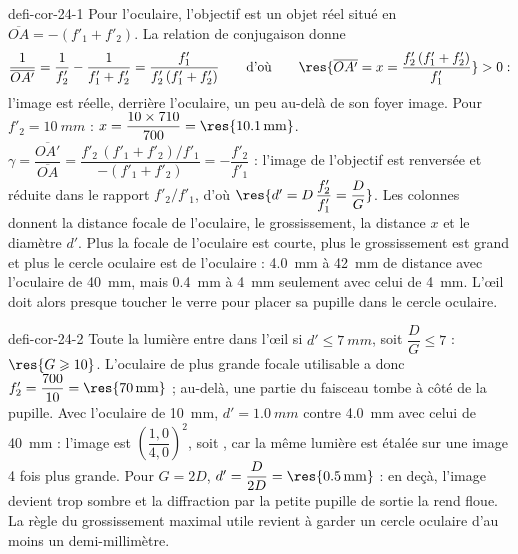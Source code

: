 \begin{blocEdition}{defi-cor-24-1}
Pour l'oculaire, l'objectif est un objet réel situé en $\overline{OA}=-(f'_1+f'_2)$. La relation de conjugaison donne
\[\frac{1}{\overline{OA'}}=\frac{1}{f'_2}-\frac{1}{f'_1+f'_2}=\frac{f'_1}{f'_2\,(f'_1+f'_2)}\qquad\text{d'où}\qquad \res{\overline{OA'}=x=\frac{f'_2\,(f'_1+f'_2)}{f'_1}}>0 :\]
l'image est réelle, derrière l'oculaire, un peu au-delà de son foyer image. Pour $f'_2=\qty{10}{mm}$ :
$x=\dfrac{10\times710}{700}=\res{\qty{10,1}{mm}}$.
$\gamma=\dfrac{\overline{OA'}}{\overline{OA}}=\dfrac{f'_2\,(f'_1+f'_2)/f'_1}{-(f'_1+f'_2)}=-\dfrac{f'_2}{f'_1}$ : l'image de l'objectif est renversée et réduite dans le
rapport $f'_2/f'_1$, d'où $\res{d'=D\,\dfrac{f'_2}{f'_1}=\dfrac{D}{G}}$.
Les colonnes donnent la distance focale de l'oculaire, le grossissement, la distance $x$ et le diamètre $d'$. Plus la focale
de l'oculaire est courte, plus le grossissement est grand et plus le cercle oculaire est  de
l'oculaire : \qty{4,0}{mm} à \qty{42}{mm} de distance avec l'oculaire de \qty{40}{mm}, mais \qty{0,4}{mm} à \qty{4}{mm} seulement avec celui
de \qty{4}{mm}. L'œil doit alors presque toucher le verre pour placer sa pupille dans le cercle oculaire.
\end{blocEdition}

\begin{blocEdition}{defi-cor-24-2}
\label{figedition-defi-cor-24-2-1}
Toute la lumière entre dans l'œil si $d'\leqslant\qty{7}{mm}$, soit $\dfrac{D}{G}\leqslant7$ : $\res{G\geqslant10}$. L'oculaire de plus grande focale
utilisable a donc $f'_2=\dfrac{700}{10}=\res{\qty{70}{mm}}$ ; au-delà, une partie du faisceau tombe à côté de la pupille.
Avec l'oculaire de \qty{10}{mm}, $d'=\qty{1,0}{mm}$ contre \qty{4,0}{mm} avec celui de \qty{40}{mm} : l'image est $\left(\dfrac{1{,}0}{4{,}0}\right)^2$,
soit , car la même lumière est étalée sur une image 4 fois plus grande. Pour $G=2D$,
$d'=\dfrac{D}{2D}=\res{\qty{0,5}{mm}}$ : en deçà, l'image devient trop sombre et la diffraction par la petite pupille de sortie la rend
floue. La règle du grossissement maximal utile revient à garder un cercle oculaire d'au moins un demi-millimètre.
\end{blocEdition}

